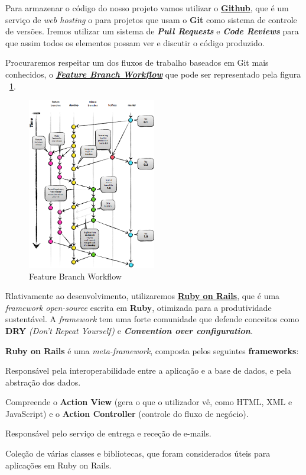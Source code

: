 Para armazenar o código do nosso projeto vamos utilizar o \href{http://github.com}{\textbf{Github}}, 
que é um serviço de \textit{web hosting} o para projetos que usam o \textbf{Git} como sistema de controle de versões. 
Iremos utilizar um sistema de \textit{\textbf{Pull Requests}} e \textit{\textbf{Code Reviews}} 
para que assim todos os elementos possam ver e discutir o código produzido.

Procuraremos respeitar um dos fluxos de trabalho baseados em Git mais conhecidos, 
o \href{https://www.atlassian.com/git/workflows#!workflow-feature-branch}{\textbf{\textit{Feature Branch Workflow}}} 
que pode ser representado pela figura ~\ref{fig:git-workflow}.

\begin{figure}[H] 
  \centering
  \includegraphics[width=0.5\textwidth]{images/tecnologias/git-workflow}
  \caption{Feature Branch Workflow}
  \label{fig:git-workflow}
\end{figure}

Rlativamente ao desenvolvimento, utilizaremos \href{http://rubyonrails.org/}{\textbf{Ruby on Rails}}, 
que é uma \textit{framework open-source} escrita em \textbf{Ruby}, otimizada para a produtividade sustentável. 
A \textit{framework} tem uma forte comunidade que defende conceitos como \textbf{DRY} \textit{(Don't Repeat Yourself)} 
e \textbf{\textit{Convention over configuration}}.

\textbf{Ruby on Rails} é uma \textit{meta-framework}, composta pelos seguintes \textbf{frameworks}:

\begin{description}[labelindent=1cm]
  \item[Active Record] Responsável pela interoperabilidade entre a aplicação e a base de dados, e pela abstração dos dados.
  \item[Action Pack] Compreende o \textbf{Action View} (gera o que o utilizador vê, como HTML, XML e JavaScript) 
  e o \textbf{Action Controller} (controle do fluxo de negócio).
  \item[Action Mailer] Responsável pelo serviço de entrega e receção de e-mails.
  \item[Active Support] Coleção de várias classes e bibliotecas, que foram considerados úteis para aplicações em Ruby on Rails.
\end{description}


